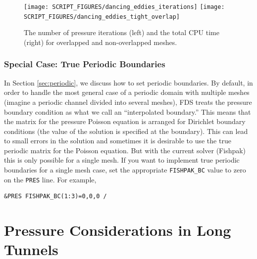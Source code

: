 \documentclass[11pt]{book}
\begin{document}
\begin{figure}[ht]
\texttt{[image: SCRIPT\_FIGURES/dancing\_eddies\_iterations]}
\texttt{[image: SCRIPT\_FIGURES/dancing\_eddies\_tight\_overlap]}
\caption[Reduction of pressure iterations in the {\ct dancing\_eddies} test cases]{The number of pressure iterations (left) and the total CPU time (right) for overlapped and non-overlapped meshes.}
\label{dancing_eddies_overlap}
\end{figure}

\subsubsection{Special Case: True Periodic Boundaries}
\label{sec:true_periodic_boundaries}

In Section \ref{sec:periodic}, we discuss how to set periodic boundaries.  By default, in order to handle the most general case of a periodic domain with multiple meshes (imagine a periodic channel divided into several meshes), FDS treats the pressure boundary condition as what we call an ``interpolated boundary.''  This means that the matrix for the pressure Poisson equation is arranged for Dirichlet boundary conditions (the value of the solution is specified at the boundary).  This can lead to small errors in the solution and sometimes it is desirable to use the true periodic matrix for the Poisson equation.  But with the current solver (Fishpak) this is only possible for a single mesh.  If you want to implement true periodic boundaries for a single mesh case, set the appropriate \verb=FISHPAK_BC= value to zero on the \verb=PRES= line.  For example,
\begin{lstlisting}
&PRES FISHPAK_BC(1:3)=0,0,0 /
\end{lstlisting}



\section{Pressure Considerations in Long Tunnels}
\label{tunnel_demo}
\end{document}
